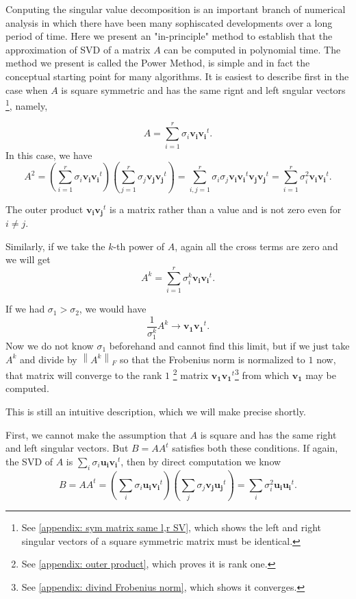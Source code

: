 Conputing the singular value decomposition is an important branch of numerical analysis in which there have been many sophiscated developments over a long period of time. Here we present an "in-principle" method to establish that the approximation of SVD of a matrix \(A\) can be computed in polynomial time. The method we present is called the Power Method, is simple and in fact the conceptual starting point for many algorithms. It is easiest to describe first in the case when \(A\) is square symmetric and has the same rignt and left sngular vectors \footnote{See \autoref{appendix: sym matrix same l,r SV}, which shows the left and right singular vectors of a square symmetric matrix must be identical. }, namely, 

\[
  A = \sum_{i=1}^r \sigma _i \mathbf{v_i} \mathbf{v_i}^t.     
\]
In this case, we have 
\[
  A^2 = \left( \sum_{i=1}^r \sigma _i \mathbf{v_i} \mathbf{v_i}^t    \right) \left( \sum_{j=1}^r \sigma _j \mathbf{v_j} \mathbf{v_j}^t    \right) = \sum_{i,j=1}^r \sigma _i \sigma _j \mathbf{v_i} \mathbf{v_i}^t \mathbf{v_j} \mathbf{v_j}^t = \sum_{i=1}^r \sigma _i^2 \mathbf{v_i} \mathbf{v_i}^t.     
\]

\begin{note}
The outer product  \(\mathbf{v_i} \mathbf{v_j}^t  \) is a matrix rather than a value and is not zero even for \(i \neq j\). 
\end{note}

Similarly, if we take the \(k\)-th power of \(A\), again all the cross terms are zero and we will get 
\[
  A^k = \sum_{i=1}^r \sigma _i^k \mathbf{v_i} \mathbf{v_i}^t.   
\]  

If we had \(\sigma _1 > \sigma _2\), we would have 
\[
  \frac{1}{\sigma _1^k} A^k \to \mathbf{v_1} \mathbf{v_1}^t. 
\] 
Now we do not know \(\sigma _1\) beforehand and cannot find this limit, but if we just take \(A^k\) and divide by \( \left\lVert A^k \right\rVert _F \) so that the Frobenius norm is normalized to \(1\) now, that matrix will converge to the rank \(1\) \footnote{See \autoref{appendix: outer product}, which proves it is rank one.} matrix \(\mathbf{v_1} \mathbf{v_1}^t \)\footnote{See \autoref{appendix: divind Frobenius norm}, which shows it converges.} from which \(\mathbf{v_1} \) may be computed.

\begin{note}
  This is still an intuitive description, which we will make precise shortly.
\end{note}

First, we cannot make the assumption that \(A\) is square and has the same right and left singular vectors. But \(B = A A^t\) satisfies both these conditions. If again, the SVD of \(A\) is \(\sum_{i} \sigma _i \mathbf{u_i} \mathbf{v_i}^t\), then by direct computation we know 
\[
  B = AA^t = \left( \sum_{i} \sigma _i \mathbf{u_i} \mathbf{v_i}^t    \right)\left( \sum_{j} \sigma _j \mathbf{v_j} \mathbf{u_j}^t    \right)  = \sum_{i} \sigma _i^2 \mathbf{u_i} \mathbf{u_i}^t.   
\]    

